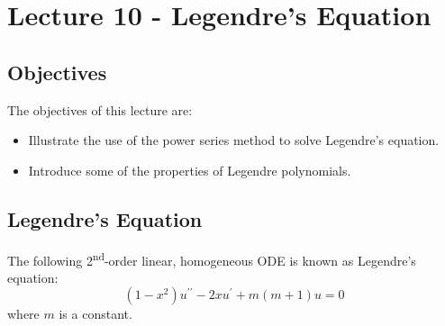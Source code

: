 \chapter{Lecture 10 - Legendre's Equation}
\label{ch:lec10}
\section{Objectives}
The objectives of this lecture are:
\begin{itemize}
\item Illustrate the use of the power series method to solve Legendre's equation. 
\item Introduce some of the properties of Legendre polynomials.
\end{itemize}

\section{Legendre's Equation} 
The following 2\textsuperscript{nd}-order linear, homogeneous ODE is known as Legendre's equation:
\begin{equation}
\left(1-x^2 \right)u^{\prime \prime}-2xu^{\prime} + m(m+1)u = 0 
\label{eq:legendre}
\end{equation}
where $m$ is a constant.

